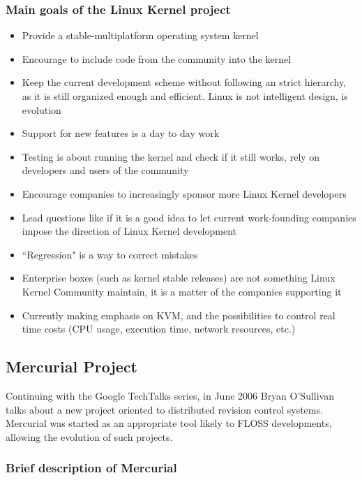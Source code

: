 \documentclass[11pt]{article} %
\begin{document}
\subsubsection{Main goals of the Linux Kernel project}

  	\begin{itemize}
  	  \item Provide a stable-multiplatform operating system kernel
  	  \item Encourage to include code from the community into the kernel
  	  \item Keep the current development scheme without following an strict hierarchy, as it is still organized enough and efficient. Linux is not intelligent design, is evolution
  	  \item Support for new features is a day to day work
  	  \item Testing is about running the kernel and check if it still works, rely on developers and users of the community
  	  \item Encourage companies to increasingly sponsor more Linux Kernel developers
  	  \item Lead questions like if it is a good idea to let current work-founding companies impose the direction of Linux Kernel development
  	  \item ``Regression" is a way to correct mistakes
  	  \item Enterprise boxes (such as kernel stable releases) are not something Linux Kernel Community maintain, it is a matter of the companies supporting it
  	  \item Currently making emphasis on KVM, and the possibilities to control real time costs (CPU usage, execution time, network resources, etc.)
  	\end{itemize}

\subsection{Mercurial Project}

Continuing with the Google TechTalks series, in June 2006 Bryan O'Sullivan talks about a new project oriented to distributed revision control systems. Mercurial was started as an appropriate tool likely to FLOSS developments, allowing the evolution of such projects.

\subsubsection{Brief description of Mercurial}
\end{document}
